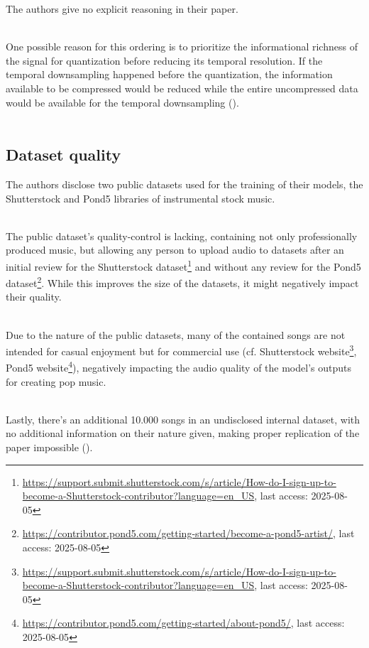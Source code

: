 \documentclass[a4paper,12pt,twoside]{article}
\begin{document}
The authors give no explicit reasoning in their paper. \\ \

One possible reason for this ordering is to prioritize the informational richness of the signal for quantization before reducing its temporal resolution. If the temporal downsampling happened before the quantization, the information available to be compressed would be reduced while the entire uncompressed data would be available for the temporal downsampling (\cite{tishbyInformationBottleneckMethod2000}). \\ \

\subsection{Dataset quality}
The authors disclose two public datasets used for the training of their models, the Shutterstock and Pond5 libraries of instrumental stock music. \\ \


The public dataset's quality-control is lacking, containing not only professionally produced music, but allowing any person to upload audio to  datasets after an initial review for the Shutterstock dataset\footnote{\url{https://support.submit.shutterstock.com/s/article/How-do-I-sign-up-to-become-a-Shutterstock-contributor?language=en_US}, last access: 2025-08-05} and without any review for the Pond5 dataset\footnote{\url{https://contributor.pond5.com/getting-started/become-a-pond5-artist/}, last access: 2025-08-05}. While this improves the size of the datasets, it might negatively impact their quality. \\ \

Due to the nature of the public datasets, many of the contained songs are not intended for casual enjoyment but for commercial use (cf. Shutterstock website\footnote{\url{https://support.submit.shutterstock.com/s/article/How-do-I-sign-up-to-become-a-Shutterstock-contributor?language=en_US}, last access: 2025-08-05}, Pond5 website\footnote{\url{https://contributor.pond5.com/getting-started/about-pond5/}, last access: 2025-08-05}), negatively impacting the audio quality of the model's outputs for creating pop music. \\ \

Lastly, there's an additional 10.000 songs in an undisclosed internal dataset, with no additional information on their nature given, making proper replication of the paper impossible (\cite{rouardAudioConditioningMusic2024}).
\end{document}

